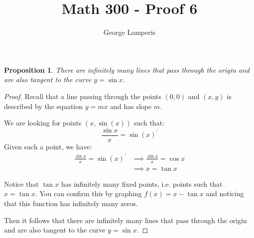 \documentclass[12pt]{article}
\title{Math 300 - Proof 6}
\author{George Lamperis}
\date{}
\theoremstyle{mystyle}
\newtheorem{prop}[thm]{Proposition}
\begin{document}
\maketitle

\begin{prop}
  There are infinitely many lines that pass through the origin and are
  also tangent to the curve $y = \sin x$.
\end{prop}
\begin{proof}
  Recall that a line passing through the points $(0,0)$ and $(x,y)$ is
  described by the equation $y=mx$ and has slope $m$.
  
  We are looking for points $(x, \sin(x))$ such that:
  $$
    \frac{\sin x}{x} = \sin(x)^\prime 
  $$
  Given such a point, we have:
  \begin{align*}
    \frac{\sin x}{x} = \sin(x)^\prime 
    &\implies \frac{\sin x}{x} = \cos x \\
    &\implies x = \tan x
  \end{align*}

  Notice that $\tan x$ has infinitely many fixed points, i.e. points such that 
  $x = \tan x$. You can confirm this by graphing $f(x) = x - \tan x$ and
  noticing that this function has infinitely many zeros.
  
  Then it follows that there are infinitely many lines that pass
  through the origin and are also tangent to the curve $y = \sin x$.
\end{proof}
\end{document}
